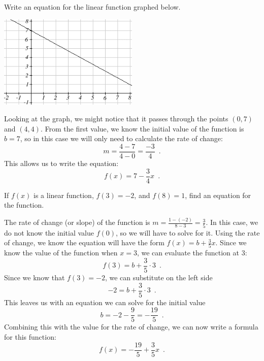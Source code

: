 \begin{example}

Write an equation for the linear function graphed below.
\begin{center}
\includegraphics[width=0.5\textwidth]{img/chap1/sec1-4/image048.png}
\end{center}

\begin{solution} Looking at the graph, we might notice that it passes through the points $(0, 7)$ and $(4, 4)$. From the first value, we know the initial value of the function is $b = 7$, so in this case we will only need to calculate the rate of change:
$$m = \frac{4-7}{4-0}=\frac{-3}{4} \enspace . $$
This allows us to write the equation:
$$f(x) = 7-\frac{3}{4} x \enspace .$$

\end{solution}\end{example}

\begin{example}
If $f(x)$ is a linear function, $f(3)=-2$, and $f(8) = 1$, find an equation for the function.

\begin{solution} The rate of change (or slope) of the function is $m = \frac{1-(-2)}{8-3} = \frac{3}{5}$. In this case, we do not know the initial value $f(0)$, so we will have to solve for it. Using the rate of change, we know the equation will have the form $f(x) = b + \frac{3}{5}x$. Since we know the value of the function when $x = 3$, we can evaluate the function at 3:
$$f(3)= b + \frac{3}{5}\cdot 3 \enspace.$$
Since we know that $f(3)=-2$, we can substitute on the left side
$$ -2 = b + \frac{3}{5}\cdot 3 \enspace.$$
This leaves us with an equation we can solve for the initial value
$$b = -2 - \frac{9}{5}= -\frac{19}{5} \enspace .$$
Combining this with the value for the rate of change, we can now write a formula for this function:
$$f(x)=-\frac{19}{5} + \frac{3}{5}x\enspace .$$
\end{solution}\end{example}

